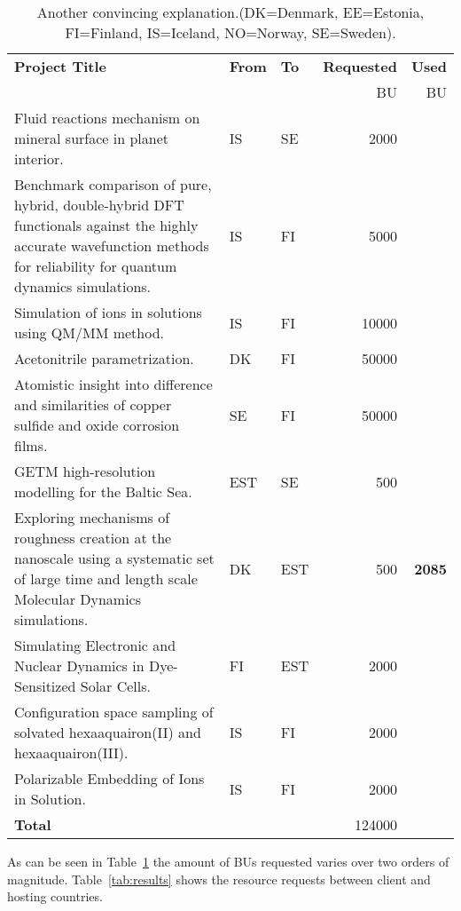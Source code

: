 \begin{table}
\begin{center}
\begin{tabular}{|p{7cm}|l|l|r|r|} \hline
\bf Project Title & \bf From & \bf To &\bf Requested &\bf Used \\
                  & & & BU & BU \\\hline
Fluid reactions mechanism on mineral surface in planet interior. & IS & SE & 2000 &  \\
Benchmark comparison of pure, hybrid, double-hybrid DFT functionals against the highly accurate wavefunction methods for reliability for quantum dynamics simulations. & IS & FI & 5000 & \\
Simulation of ions in solutions using QM/MM method. & IS & FI & 10000 & \\
Acetonitrile parametrization. & DK & FI & 50000 & \\
Atomistic insight into difference and similarities of copper sulfide and oxide corrosion films. & SE & FI & 50000 & \\
GETM high-resolution modelling for the Baltic Sea. & EST & SE & 500 & \\
Exploring mechanisms of roughness creation at the nanoscale using a systematic set of large time and length scale Molecular Dynamics simulations. & DK & EST & 500 & {\bf 2085}\\
Simulating Electronic and Nuclear Dynamics in Dye-Sensitized Solar Cells. & FI & EST & 2000 & \\
Configuration space sampling of solvated hexaaquairon(II) and hexaaquairon(III). & IS & FI & 2000 & \\
Polarizable Embedding of Ions in Solution. & IS & FI & 2000 & \\
\bf Total & & & 124000 & \\\hline
\end{tabular}
\caption{Another convincing explanation.(DK=Denmark, EE=Estonia, FI=Finland, IS=Iceland, NO=Norway, SE=Sweden). \label{tab:projects}}
\end{center}
\end{table}
As can be seen in Table~\ref{tab:projects} the amount of BUs requested varies over two orders of magnitude.
Table~\ref{tab:results} shows the resource requests between client and hosting countries.
